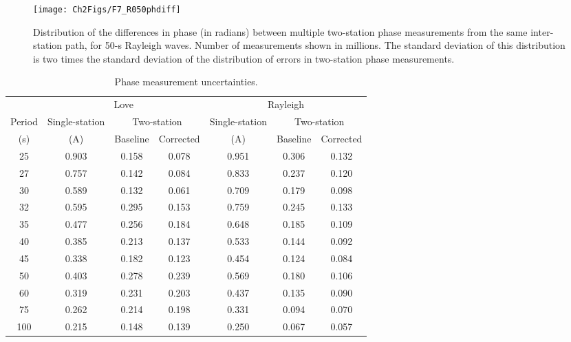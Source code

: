 \documentclass[12pt,oneside]{book}
\begin{document}
\begin{figure} 
\begin{center}
\texttt{[image: Ch2Figs/F7\_R050phdiff]} 
\caption[Distribution of phase differences for uncertainty estimation]{Distribution of the differences in phase (in radians) between multiple two-station phase measurements from the same inter-station path, for 50-s Rayleigh waves. Number of measurements shown in millions. The standard deviation of this distribution is two times the standard deviation of the distribution of errors in two-station phase measurements. }
\label{figpv:TSPHDIFF_R050}
\end{center}
\end{figure}
%
\begin{table}
\caption{Phase measurement uncertainties.}\label{tablepv:uncertainty}
\begin{center}
\begin{tabular}{ c  c c c  c c c }
\toprule%
\,  &\multicolumn{3}{c}{Love} &\multicolumn{3}{c}{Rayleigh} \\ \cmidrule(r){2-4}\cmidrule(r){5-7} 
Period &Single-station  &\multicolumn{2}{c}{Two-station} &Single-station   &\multicolumn{2}{c}{Two-station} \\
(s) &(A) &Baseline &Corrected &(A) &Baseline &Corrected \\ 
\toprule
25	 &0.903 &0.158 &0.078 &0.951 &0.306 &0.132 \\ 
27	 &0.757 &0.142 &0.084 &0.833 &0.237 &0.120 \\ 
30	 &0.589 &0.132 &0.061 &0.709 &0.179 &0.098 \\ \midrule
32	 &0.595 &0.295 &0.153 &0.759 &0.245 &0.133 \\ 
35	 &0.477 &0.256 &0.184 &0.648 &0.185 &0.109 \\ 
40	 &0.385 &0.213 &0.137 &0.533 &0.144 &0.092 \\ 
45	 &0.338 &0.182 &0.123 &0.454 &0.124 &0.084 \\ \midrule
50	 &0.403 &0.278 &0.239 &0.569 &0.180 &0.106 \\ 
60	 &0.319 &0.231 &0.203 &0.437 &0.135 &0.090 \\ 
75	 &0.262 &0.214 &0.198 &0.331 &0.094 &0.070 \\ 
100	 &0.215 &0.148 &0.139 &0.250 &0.067 &0.057 \\ \bottomrule 
\end{tabular}%

\end{center}
\end{table}
\end{document}
